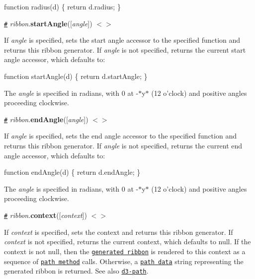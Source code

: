 \begin{DoxyCode}
function radius(d) \{
  return d.radius;
\}
\end{DoxyCode}


\href{#ribbon_startAngle}{\tt \#} {\itshape ribbon}.{\bfseries start\+Angle}(\mbox{[}{\itshape angle}\mbox{]}) \href{https://github.com/d3/d3-chord/blob/master/src/ribbon.js#L66}{\tt $<$$>$}

If {\itshape angle} is specified, sets the start angle accessor to the specified function and returns this ribbon generator. If {\itshape angle} is not specified, returns the current start angle accessor, which defaults to\+:


\begin{DoxyCode}
function startAngle(d) \{
  return d.startAngle;
\}
\end{DoxyCode}


The {\itshape angle} is specified in radians, with 0 at -\/$\ast$y$\ast$ (12 o’clock) and positive angles proceeding clockwise.

\href{#ribbon_endAngle}{\tt \#} {\itshape ribbon}.{\bfseries end\+Angle}(\mbox{[}{\itshape angle}\mbox{]}) \href{https://github.com/d3/d3-chord/blob/master/src/ribbon.js#L70}{\tt $<$$>$}

If {\itshape angle} is specified, sets the end angle accessor to the specified function and returns this ribbon generator. If {\itshape angle} is not specified, returns the current end angle accessor, which defaults to\+:


\begin{DoxyCode}
function endAngle(d) \{
  return d.endAngle;
\}
\end{DoxyCode}


The {\itshape angle} is specified in radians, with 0 at -\/$\ast$y$\ast$ (12 o’clock) and positive angles proceeding clockwise.

\href{#ribbon_context}{\tt \#} {\itshape ribbon}.{\bfseries context}(\mbox{[}{\itshape context}\mbox{]}) \href{https://github.com/d3/d3-chord/blob/master/src/ribbon.js#L82}{\tt $<$$>$}

If {\itshape context} is specified, sets the context and returns this ribbon generator. If {\itshape context} is not specified, returns the current context, which defaults to null. If the context is not null, then the \href{#_ribbon}{\tt generated ribbon} is rendered to this context as a sequence of \href{http://www.w3.org/TR/2dcontext/#canvaspathmethods}{\tt path method} calls. Otherwise, a \href{http://www.w3.org/TR/SVG/paths.html#PathData}{\tt path data} string representing the generated ribbon is returned. See also \href{https://github.com/d3/d3-path}{\tt d3-\/path}. 